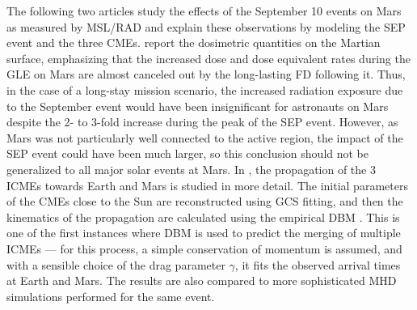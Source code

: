 The following two articles \citep{Zeitlin-2018,Guo-2018} study the effects of the September 10 events on Mars as measured by \ac{MSL}/\ac{RAD} and explain these observations by modeling the \ac{SEP} event and the three \acp{CME}. \citet{Zeitlin-2018} report the dosimetric quantities on the Martian surface, emphasizing that the increased dose and dose equivalent rates during the \ac{GLE} on Mars are almost canceled out by the long-lasting \ac{FD} following it. Thus, in the case of a long-stay mission scenario, the increased radiation exposure due to the September event would have been insignificant for astronauts on Mars despite the 2- to 3-fold increase during the peak of the \ac{SEP} event. However, as Mars was not particularly well connected to the active region, the impact of the \ac{SEP} event could have been much larger, so this conclusion should not be generalized to all major solar events at Mars. In \citet{Guo-2018}, the propagation of the 3 \acp{ICME} towards Earth and Mars is studied in more detail. The initial parameters of the \acp{CME} close to the Sun are reconstructed using \ac{GCS} fitting, and then the kinematics of the propagation are calculated using the empirical \ac{DBM} \citep{Vrsnak-2007,Vrsnak-2013}. This is one of the first instances where \ac{DBM} is used to predict the merging of multiple \acp{ICME} --- for this process, a simple conservation of momentum is assumed, and with a sensible choice of the drag parameter $\gamma$, it fits the observed arrival times at Earth and Mars. The results are also compared to more sophisticated \ac{MHD} simulations performed for the same event.


